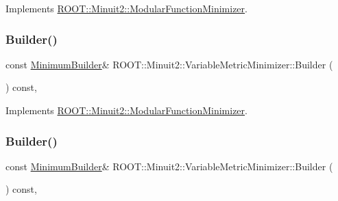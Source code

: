 Implements \mbox{\hyperlink{classROOT_1_1Minuit2_1_1ModularFunctionMinimizer_a13e98551cf14e927c61e1e34ecf8ba8b}{R\+O\+O\+T\+::\+Minuit2\+::\+Modular\+Function\+Minimizer}}.

\mbox{\label{classROOT_1_1Minuit2_1_1VariableMetricMinimizer_aa31a52e431960a91acf0b9c2997b397b}} 
\subsubsection{\texorpdfstring{Builder()}{Builder()}\hspace{0.1cm}{\footnotesize\ttfamily [2/3]}}
{\footnotesize\ttfamily const \mbox{\hyperlink{classROOT_1_1Minuit2_1_1MinimumBuilder}{Minimum\+Builder}}\& R\+O\+O\+T\+::\+Minuit2\+::\+Variable\+Metric\+Minimizer\+::\+Builder (\begin{DoxyParamCaption}{ }\end{DoxyParamCaption}) const\hspace{0.3cm}{\ttfamily [inline]}, {\ttfamily [virtual]}}



Implements \mbox{\hyperlink{classROOT_1_1Minuit2_1_1ModularFunctionMinimizer_a13e98551cf14e927c61e1e34ecf8ba8b}{R\+O\+O\+T\+::\+Minuit2\+::\+Modular\+Function\+Minimizer}}.

\mbox{\label{classROOT_1_1Minuit2_1_1VariableMetricMinimizer_aa31a52e431960a91acf0b9c2997b397b}} 
\subsubsection{\texorpdfstring{Builder()}{Builder()}\hspace{0.1cm}{\footnotesize\ttfamily [3/3]}}
{\footnotesize\ttfamily const \mbox{\hyperlink{classROOT_1_1Minuit2_1_1MinimumBuilder}{Minimum\+Builder}}\& R\+O\+O\+T\+::\+Minuit2\+::\+Variable\+Metric\+Minimizer\+::\+Builder (\begin{DoxyParamCaption}{ }\end{DoxyParamCaption}) const\hspace{0.3cm}{\ttfamily [inline]}, {\ttfamily [virtual]}}



